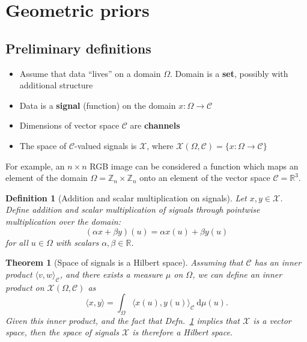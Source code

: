 \documentclass[11pt]{article}
\numberwithin{equation}{section}
\newtheorem{thm}{Theorem}[section]
\newtheorem{defn}{Definition}[section]
\begin{document}
\newcommand{\f}{\mathfrak}
\section{Geometric priors}

\subsection{Preliminary definitions}
\begin{itemize}[noitemsep]
\item Assume that data ``lives'' on a domain $\Omega$. Domain is a \textbf{set}, possibly with additional structure
\item Data is a \textbf{signal} (function) on the domain $x : \Omega \rightarrow \mathcal{C}$
\item Dimensions of vector space $\mathcal{C}$ are \textbf{channels}
\item The space of $\mathcal{C}$-valued signals is $\mathcal{X}$, where $\mathcal{X}(\Omega, \mathcal{C}) = \{x: \Omega \rightarrow \mathcal{C} \}$
\end{itemize}

For example, an $n \times n$ RGB image can be considered a function which maps an element of the domain $\Omega = \mathbb{Z}_n \times \mathbb{Z}_n$ onto an element of the vector space $\mathcal{C}=\mathbb{R}^3$. 

\begin{defn}[Addition and scalar multiplication on signals] \label{defn:add-mul-signals}
Let $x,y \in \mathcal{X}$. Define addition and scalar multiplication of signals through pointwise multiplication over the domain: 
\begin{equation}
(\alpha x + \beta y)(u) = \alpha x(u) + \beta y(u)
\end{equation}
for all $u \in \Omega$ with scalars $\alpha, \beta \in \mathbb{R}$.
\end{defn}

\begin{thm}[Space of signals is a Hilbert space]
Assuming that $\mathcal{C}$ has an inner product $\langle v, w \rangle_\mathcal{C}$, and there exists a measure $\mu$ on $\Omega$, we can define an inner product on $\mathcal{X}(\Omega, \mathcal{C})$ as
\begin{equation}
\langle x, y \rangle = \int_\Omega \langle x(u), y(u) \rangle_\mathcal{C}\ \mathrm{d}\mu(u). \label{eq:inner-prod-signals}
\end{equation}
Given this inner product, and the fact that Defn.~\ref{defn:add-mul-signals} implies that $\mathcal{X}$ is a vector space, then the space of signals $\mathcal{X}$ is therefore a Hilbert space.
\end{thm}
\end{document}
